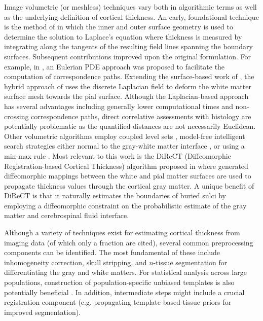 Image volumetric (or meshless) techniques vary both in algorithmic terms as well as
the underlying definition of cortical thickness.  An early, foundational technique is the 
method of \cite{jones2000} in which the inner and outer surface geometry is used to determine the
solution to Laplace's equation where thickness is measured by integrating along the 
tangents of the resulting field lines spanning the boundary surfaces.  Subsequent contributions
improved upon the original formulation.  For example, in \cite{yezzi2003}, an Eulerian PDE approach
was proposed to facilitate the computation of correspondence paths.  Extending the surface-based
work of \cite{macdonald2000}, the hybrid approach of
\cite{kim2005} uses the discrete Laplacian field to deform the white matter surface mesh towards the 
pial surface.    Although the Laplacian-based approach has several advantages
including generally lower computational times and 
non-crossing correspondence paths, direct correlative assessments with histology
are potentially problematic as the quantified distances 
are not necessarily Euclidean.  Other volumetric algorithms employ coupled
level sets \citep{zeng1999}, model-free intelligent search strategies either normal to 
the gray-white matter interface \citep{scott2009}, or using a min-max rule \citep{clement-vachet2011}.
Most relevant to this work is the DiReCT (Diffeomorphic Registration-based 
Cortical Thickness) algorithm proposed in \cite{das2009} where generated
diffeomorphic mappings between the 
white and pial matter surfaces are used to propagate thickness values 
through the cortical gray matter.  A unique benefit of DiReCT is that it
naturally estimates the boundaries of buried sulci by employing a
diffeomorphic constraint on the probabilistic estimate of the gray
matter and cerebrospinal fluid interface.  

Although a variety of techniques exist for estimating cortical thickness
from imaging data (of which only a fraction are cited), several common preprocessing components
can be identified.  The most fundamental of these include inhomogeneity correction, skull stripping, and $n$-tissue segmentation for differentiating the gray and white matters.  For statistical analysis 
across large populations, construction of population-specific unbiased templates
is also potentially beneficial \citep{evans2012}.
In addition, intermediate steps might include a crucial registration component (e.g. 
propagating template-based tissue priors for improved segmentation).

